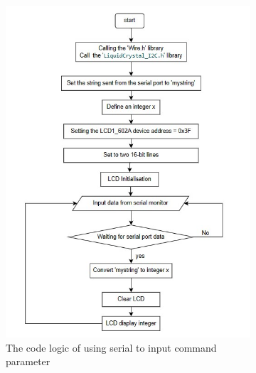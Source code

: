 \begin{figure}[H] %
    \centering %
    \captionsetup{labelsep=colon}
    \begin{subfigure}{0.45\textwidth} %
        \centering
        \includegraphics[width=\linewidth]{Image/Design/code_logic_input.jpg}
        \caption{\centering The code logic of using serial to input command parameter}
        \label{fig:cl_input}
    \end{subfigure}
    \begin{subfigure}{0.45\textwidth} %
        \centering

\end{subfigure}
\end{figure}
